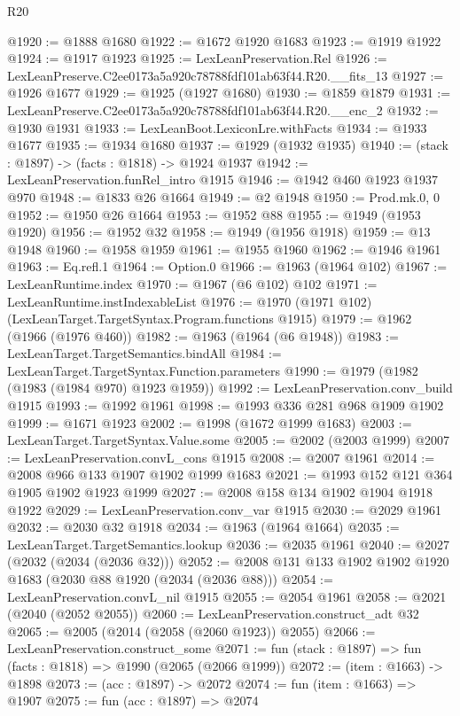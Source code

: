 \begin{lexlean}{R20}
\begin{coremodule}
@1920 := @1888 @1680
@1922 := @1672 @1920 @1683
@1923 := @1919 @1922
@1924 := @1917 @1923
@1925 := LexLeanPreservation.Rel
@1926 := LexLeanPreserve.C2ee0173a5a920c78788fdf101ab63f44.R20.__fits_13
@1927 := @1926 @1677
@1929 := @1925 (@1927 @1680)
@1930 := @1859 @1879
@1931 := LexLeanPreserve.C2ee0173a5a920c78788fdf101ab63f44.R20.__enc_2
@1932 := @1930 @1931
@1933 := LexLeanBoot.LexiconLre.withFacts
@1934 := @1933 @1677
@1935 := @1934 @1680
@1937 := @1929 (@1932 @1935)
@1940 := (stack : @1897) -> (facts : @1818) -> @1924 @1937
@1942 := LexLeanPreservation.funRel_intro @1915
@1946 := @1942 @460 @1923 @1937 @970
@1948 := @1833 @26 @1664
@1949 := @2 @1948
@1950 := Prod.mk.{0, 0}
@1952 := @1950 @26 @1664
@1953 := @1952 @88
@1955 := @1949 (@1953 @1920)
@1956 := @1952 @32
@1958 := @1949 (@1956 @1918)
@1959 := @13 @1948
@1960 := @1958 @1959
@1961 := @1955 @1960
@1962 := @1946 @1961
@1963 := Eq.refl.{1}
@1964 := Option.{0}
@1966 := @1963 (@1964 @102)
@1967 := LexLeanRuntime.index
@1970 := @1967 (@6 @102) @102
@1971 := LexLeanRuntime.instIndexableList
@1976 := @1970 (@1971 @102) (LexLeanTarget.TargetSyntax.Program.functions @1915)
@1979 := @1962 (@1966 (@1976 @460))
@1982 := @1963 (@1964 (@6 @1948))
@1983 := LexLeanTarget.TargetSemantics.bindAll
@1984 := LexLeanTarget.TargetSyntax.Function.parameters
@1990 := @1979 (@1982 (@1983 (@1984 @970) @1923 @1959))
@1992 := LexLeanPreservation.conv_build @1915
@1993 := @1992 @1961
@1998 := @1993 @336 @281 @968 @1909 @1902
@1999 := @1671 @1923
@2002 := @1998 (@1672 @1999 @1683)
@2003 := LexLeanTarget.TargetSyntax.Value.some
@2005 := @2002 (@2003 @1999)
@2007 := LexLeanPreservation.convL_cons @1915
@2008 := @2007 @1961
@2014 := @2008 @966 @133 @1907 @1902 @1999 @1683
@2021 := @1993 @152 @121 @364 @1905 @1902 @1923 @1999
@2027 := @2008 @158 @134 @1902 @1904 @1918 @1922
@2029 := LexLeanPreservation.conv_var @1915
@2030 := @2029 @1961
@2032 := @2030 @32 @1918
@2034 := @1963 (@1964 @1664)
@2035 := LexLeanTarget.TargetSemantics.lookup
@2036 := @2035 @1961
@2040 := @2027 (@2032 (@2034 (@2036 @32)))
@2052 := @2008 @131 @133 @1902 @1902 @1920 @1683 (@2030 @88 @1920 (@2034 (@2036 @88)))
@2054 := LexLeanPreservation.convL_nil @1915
@2055 := @2054 @1961
@2058 := @2021 (@2040 (@2052 @2055))
@2060 := LexLeanPreservation.construct_adt @32
@2065 := @2005 (@2014 (@2058 (@2060 @1923)) @2055)
@2066 := LexLeanPreservation.construct_some
@2071 := fun (stack : @1897) => fun (facts : @1818) => @1990 (@2065 (@2066 @1999))
@2072 := (item : @1663) -> @1898
@2073 := (acc : @1897) -> @2072
@2074 := fun (item : @1663) => @1907
@2075 := fun (acc : @1897) => @2074

\end{coremodule}
\end{lexlean}
